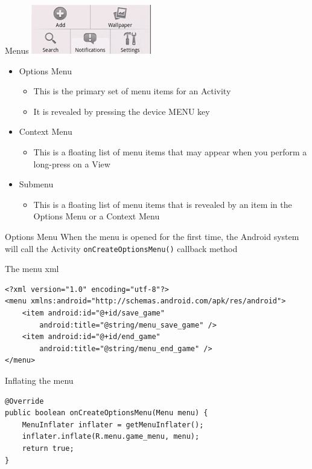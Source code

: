 \begin{frame}{Menus}
\includegraphics[scale=0.5]{images/menu}
\begin{itemize}
  \item Options Menu
  \begin{itemize}
  \item This is the primary set of menu items for an Activity
  \item It is revealed by pressing the device MENU key
  \end{itemize}
  \item Context Menu
  \begin{itemize}
  \item This is a floating list of menu items that may appear
when you perform a long-press on a View
  \end{itemize}
  \item Submenu
  \begin{itemize}
  \item This is a floating list of menu items that is revealed by
an item in the Options Menu or a Context Menu
  \end{itemize}
\end{itemize}
\end{frame}

\begin{frame}[fragile,shrink=10]{Options Menu}
When the menu is opened for the first time, the Android system will
call the Activity \texttt{onCreateOptionsMenu()} callback method
\begin{exampleblock}{The menu xml}
\begin{lstlisting}
<?xml version="1.0" encoding="utf-8"?>
<menu xmlns:android="http://schemas.android.com/apk/res/android">
    <item android:id="@+id/save_game" 
        android:title="@string/menu_save_game" />
    <item android:id="@+id/end_game" 
        android:title="@string/menu_end_game" />
</menu>
\end{lstlisting}
\end{exampleblock}
\begin{exampleblock}{Inflating the menu}
\begin{lstlisting}
@Override
public boolean onCreateOptionsMenu(Menu menu) {
    MenuInflater inflater = getMenuInflater();
    inflater.inflate(R.menu.game_menu, menu);
    return true;
}
\end{lstlisting}
\end{exampleblock}
\end{frame}

\section*{}

